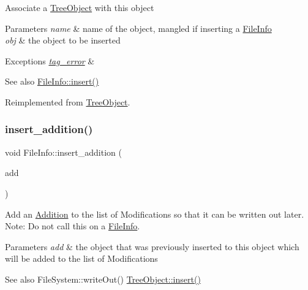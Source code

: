 Associate a \mbox{\hyperlink{classTreeObject}{Tree\+Object}} with this object 
\begin{DoxyParams}{Parameters}
{\em name} & name of the object, mangled if inserting a \mbox{\hyperlink{classFileInfo}{File\+Info}} \\
\hline
{\em obj} & the object to be inserted \\
\hline
\end{DoxyParams}

\begin{DoxyExceptions}{Exceptions}
{\em \mbox{\hyperlink{classtag__error}{tag\+\_\+error}}} & \\
\hline
\end{DoxyExceptions}
\begin{DoxySeeAlso}{See also}
\mbox{\hyperlink{classFileInfo_ad93a84b63e417b07aa68b619051ab746}{File\+Info\+::insert()}} 
\end{DoxySeeAlso}


Reimplemented from \mbox{\hyperlink{classTreeObject_af8cc57edba9f435b52ccf33cfbbb2fc6}{Tree\+Object}}.

\mbox{\label{classFileInfo_a7f788f31521c535646eebfa9959bbb24}} 
\subsubsection{\texorpdfstring{insert\+\_\+addition()}{insert\_addition()}}
{\footnotesize\ttfamily void File\+Info\+::insert\+\_\+addition (\begin{DoxyParamCaption}\item[{\mbox{\hyperlink{classTreeObject}{Tree\+Object}} $\ast$}]{add }\end{DoxyParamCaption})\hspace{0.3cm}{\ttfamily [virtual]}}

Add an \mbox{\hyperlink{classAddition}{Addition}} to the list of Modifications so that it can be written out later. Note\+: Do not call this on a \mbox{\hyperlink{classFileInfo}{File\+Info}}. 
\begin{DoxyParams}{Parameters}
{\em add} & the object that was previously inserted to this object which will be added to the list of Modifications \\
\hline
\end{DoxyParams}
\begin{DoxySeeAlso}{See also}
File\+System\+::write\+Out() \mbox{\hyperlink{classTreeObject_af8cc57edba9f435b52ccf33cfbbb2fc6}{Tree\+Object\+::insert()}} 
\end{DoxySeeAlso}



